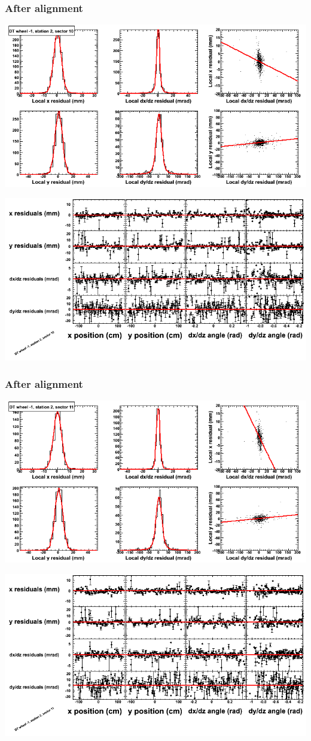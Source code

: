 \documentclass[compress]{beamer}
\begin{document}
\begin{frame}
\frametitle{After alignment}
\includegraphics[width=0.7\linewidth]{NOV4_fitfunctions/MBwhBst2sec10_bellcurves.png}

\includegraphics[width=0.7\linewidth]{NOV4_fitfunctions/MBwhBst2sec10_polynomials.png}
\end{frame}

\begin{frame}
\frametitle{After alignment}
\includegraphics[width=0.7\linewidth]{NOV4_fitfunctions/MBwhBst2sec11_bellcurves.png}

\includegraphics[width=0.7\linewidth]{NOV4_fitfunctions/MBwhBst2sec11_polynomials.png}
\end{frame}
\end{document}
